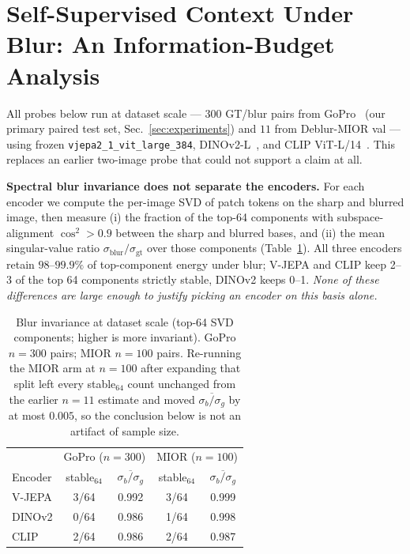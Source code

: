 \documentclass{article}
\begin{document}
\section{Self-Supervised Context Under Blur: An Information-Budget Analysis}
\label{sec:analysis}

All probes below run at dataset scale — $300$ GT/blur pairs from GoPro~\cite{nah2017deep} (our primary paired test set, Sec.~\ref{sec:experiments}) and $11$ from Deblur-MIOR val — using frozen \texttt{vjepa2\_1\_vit\_large\_384}, DINOv2-L~\cite{oquab2023dinov2}, and CLIP ViT-L/14~\cite{radford2021learning}. This replaces an earlier two-image probe that could not support a claim at all.

\textbf{Spectral blur invariance does not separate the encoders.} For each encoder we compute the per-image SVD of patch tokens on the sharp and blurred image, then measure (i) the fraction of the top-64 components with subspace-alignment $\cos^2\!>\!0.9$ between the sharp and blurred bases, and (ii) the mean singular-value ratio $\sigma_{\mathrm{blur}}/\sigma_{\mathrm{gt}}$ over those components (Table~\ref{tab:invariance}). All three encoders retain $98$--$99.9\%$ of top-component energy under blur; V-JEPA and CLIP keep 2--3 of the top 64 components strictly stable, DINOv2 keeps 0--1. \emph{None of these differences are large enough to justify picking an encoder on this basis alone.}

\begin{table}[t]
\centering
\caption{Blur invariance at dataset scale (top-64 SVD components; higher is more invariant). GoPro $n{=}300$ pairs; MIOR $n{=}100$ pairs. Re-running the MIOR arm at $n{=}100$ after expanding that split left every \mbox{stable$_{64}$} count unchanged from the earlier $n{=}11$ estimate and moved $\overline{\sigma_b/\sigma_g}$ by at most $0.005$, so the conclusion below is not an artifact of sample size.}
\label{tab:invariance}
\small
\setlength\tabcolsep{4pt}
\begin{tabular}{lcccc}
\toprule
& \multicolumn{2}{c}{GoPro ($n{=}300$)} & \multicolumn{2}{c}{MIOR ($n{=}100$)} \\
Encoder & stable$_{64}$ & $\overline{\sigma_b/\sigma_g}$ & stable$_{64}$ & $\overline{\sigma_b/\sigma_g}$ \\
\midrule
V-JEPA & 3/64 & 0.992 & 3/64 & 0.999 \\
DINOv2 & 0/64 & 0.986 & 1/64 & 0.998 \\
CLIP   & 2/64 & 0.986 & 2/64 & 0.987 \\
\bottomrule
\end{tabular}
\end{table}
\end{document}
